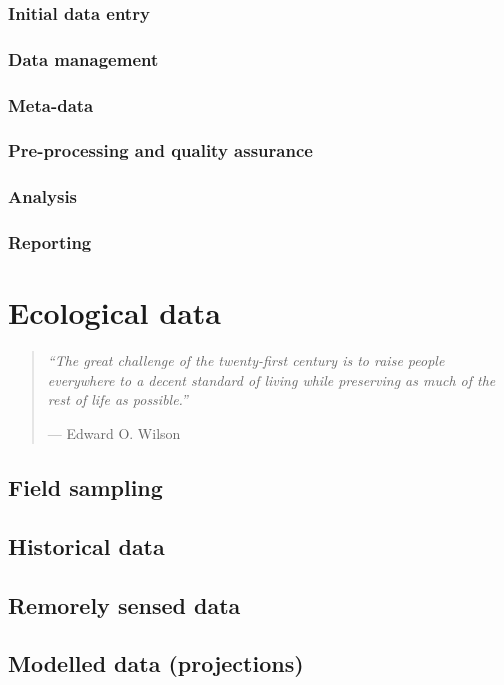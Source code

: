 \documentclass[english,10pt,a4paper,oneside]{book}
\theoremstyle{definition}
\theoremstyle{definition}
\theoremstyle{definition}
\theoremstyle{remark}
\begin{document}
\subsection{Initial data entry}\label{initial-data-entry}

\subsection{Data management}\label{data-management}

\subsection{Meta-data}\label{meta-data}

\subsection{Pre-processing and quality
assurance}\label{pre-processing-and-quality-assurance}

\subsection{Analysis}\label{analysis}

\subsection{Reporting}\label{reporting}

\chapter{Ecological data}\label{ecological-data}

\begin{quote}
\emph{\enquote{The great challenge of the twenty-first century is to
raise people everywhere to a decent standard of living while preserving
as much of the rest of life as possible.}}

--- Edward O. Wilson
\end{quote}

\section{Field sampling}\label{field-sampling-1}

\section{Historical data}\label{historical-data-1}

\section{Remorely sensed data}\label{remorely-sensed-data-1}

\section{Modelled data (projections)}\label{modelled-data-projections-1}


\end{document}
